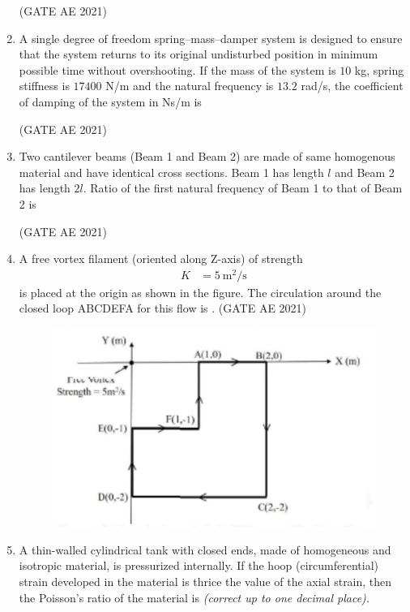 \documentclass[journal,12pt,onecolumn]{IEEEtran}
\theoremstyle{remark}
\begin{document}
\begin{flushleft}
\begin{enumerate}
\hfill (GATE AE 2021)

\item 
A single degree of freedom spring--mass--damper system is designed to ensure that the system returns to its original undisturbed position in minimum possible time without overshooting. If the mass of the system is $10$ kg, spring stiffness is $17400$ N/m and the natural frequency is $13.2$ rad/s, the coefficient of damping of the system in Ns/m is \underline{\hspace{2cm}} \quad {}

\hfill (GATE AE 2021)

\item 
Two cantilever beams (Beam 1 and Beam 2) are made of same homogenous material and have identical cross sections. Beam 1 has length $l$ and Beam 2 has length $2l$. Ratio of the first natural frequency of Beam 1 to that of Beam 2 is \underline{\hspace{2cm}} \quad {}

\hfill (GATE AE 2021)
\item A free vortex filament (oriented along Z-axis) of strength
\begin{align*}
K &= 5~\text{m}^2\!/\text{s}
\end{align*}
is placed at the origin as shown in the figure. The circulation around the closed loop ABCDEFA for this flow is \underline{\hspace{2cm}} .
\hfill (GATE AE 2021)

\begin{figure}[H]
    \centering
    \includegraphics[width=0.5\columnwidth]{figs/im.png}
    \caption{}
    \label{fig:placeholder}
\end{figure}



\item 
A thin-walled cylindrical tank with closed ends, made of homogeneous and isotropic material, is pressurized internally. If the hoop (circumferential) strain developed in the material is thrice the value of the axial strain, then the Poisson's ratio of the material is \underline{\hspace{2cm}} \; \textit{(correct up to one decimal place).}


\end{enumerate}
\end{flushleft}
\end{document}
